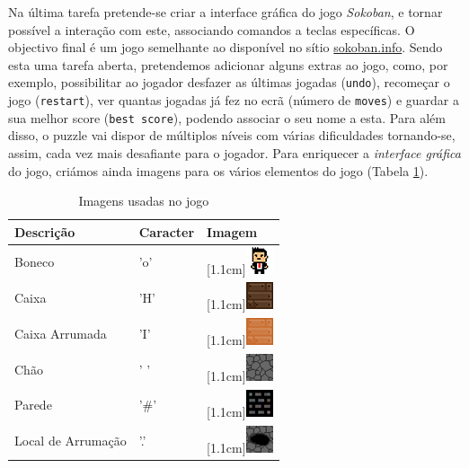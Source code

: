 \documentclass[a4paper]{article}
\begin{document}
Na última tarefa pretende-se criar a interface gráfica do jogo \emph{Sokoban}, e tornar possível a interação com este, associando comandos a teclas específicas. O objectivo final é um jogo semelhante ao disponível no sítio \href{sokoban.info}{sokoban.info}. Sendo esta uma tarefa aberta, pretendemos adicionar alguns extras ao jogo, como, por exemplo, possibilitar ao jogador desfazer as últimas jogadas (\texttt{undo}), recomeçar o jogo (\texttt{restart}), ver quantas jogadas já fez no ecrã (número de \texttt{moves}) e guardar a sua melhor score (\texttt{best score}), podendo associar o seu nome a esta. Para além disso, o puzzle vai dispor de múltiplos níveis com várias dificuldades tornando-se, assim, cada vez mais desafiante para o jogador. Para enriquecer a \emph{interface gráfica} do jogo, criámos ainda imagens para os vários elementos do jogo (Tabela \ref{table:Tabela 1}).

\begin{table}[H]
\centering
\begin{tabular}{|>{\centering\arraybackslash}m{2cm} |>{\centering\arraybackslash}m{2cm}|>{\centering\arraybackslash}m{2cm}|}
\hline
 \centering \textbf{Descrição} & \textbf{Caracter} & \textbf{Imagem} \\
\hline
  Boneco & 'o' & \raisebox{0.1cm}[1.1cm]{\includegraphics[width=0.8cm\height=0.8cm]{a2.png}} \\
\hline
 Caixa &  'H'  & \raisebox{0.1cm}[1.1cm]{\includegraphics[width=0.8cm\height=0.8cm]{a1.png}} \\
\hline
  Caixa Arrumada &  'I' &  \raisebox{0.1cm}[1.1cm]{\includegraphics[width=0.8cm\height=0.8cm]{a10.png}} \\
\hline
Chão &  ' ' &  \raisebox{0.1cm}[1.1cm]{\includegraphics[width=0.8cm\height=0.8cm]{a9.png}} \\
\hline
Parede & '\#'  &  \raisebox{0.1cm}[1.1cm]{\includegraphics[width=0.8cm\height=0.8cm]{a5.png}} \\
\hline
Local de Arrumação & '.'  &  \raisebox{0.1cm}[1.1cm]{\includegraphics[width=0.8cm\height=0.8cm]{a6.png}} \\
\hline

\end{tabular}
\caption{Imagens usadas no jogo}
\label{table:Tabela 1}
\end{table}
\end{document}
